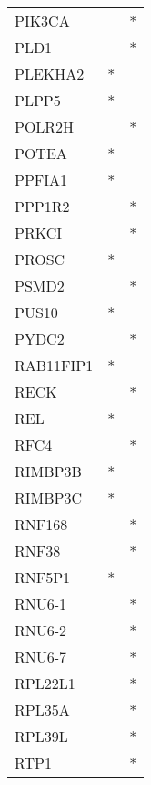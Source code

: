 \begin{longtable}{lcc}
PIK3CA           &                &          * \\
PLD1             &                &          * \\
PLEKHA2          &              * &            \\
PLPP5            &              * &            \\
POLR2H           &                &          * \\
POTEA            &              * &            \\
PPFIA1           &              * &            \\
PPP1R2           &                &          * \\
PRKCI            &                &          * \\
PROSC            &              * &            \\
PSMD2            &                &          * \\
PUS10            &              * &            \\
PYDC2            &                &          * \\
RAB11FIP1        &              * &            \\
RECK             &                &          * \\
REL              &              * &            \\
RFC4             &                &          * \\
RIMBP3B          &              * &            \\
RIMBP3C          &              * &            \\
RNF168           &                &          * \\
RNF38            &                &          * \\
RNF5P1           &              * &            \\
RNU6-1           &                &          * \\
RNU6-2           &                &          * \\
RNU6-7           &                &          * \\
RPL22L1          &                &          * \\
RPL35A           &                &          * \\
RPL39L           &                &          * \\
RTP1             &                &          * \\

\end{longtable}
